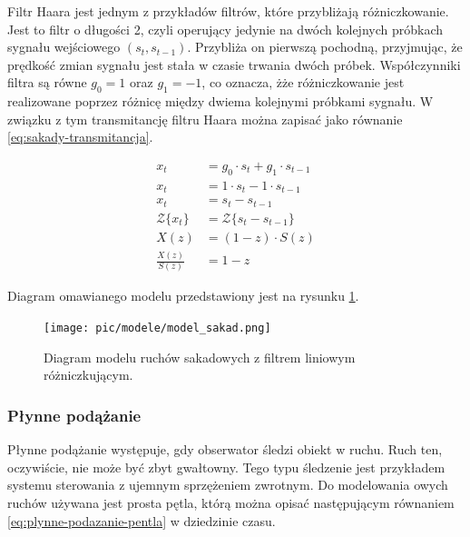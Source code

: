 \documentclass[a4paper,twoside,12pt]{book}
\begin{document}
Filtr Haara jest jednym z przykładów filtrów, które przybliżają różniczkowanie. Jest to filtr o długości 2, czyli operujący jedynie na dwóch kolejnych próbkach sygnału wejściowego $(s_t, s_{t-1})$. Przybliża on pierwszą pochodną, przyjmując, że prędkość zmian sygnału jest stała w czasie trwania dwóch próbek. Współczynniki filtra są równe $g_0 = 1$ oraz $g_1 = -1$, co oznacza, żże różniczkowanie jest realizowane poprzez różnicę między dwiema kolejnymi próbkami sygnału. W związku z tym transmitancję filtru Haara można zapisać jako równanie \ref{eq:sakady-transmitancja}.

\begin{align} %
	x_t &= g_0 \cdot s_t + g_1 \cdot s_{t-1} \nonumber \\
	x_t &= 1 \cdot s_t - 1 \cdot s_{t-1} \nonumber \\
	x_t &= s_t - s_{t-1} \nonumber \\
	\mathcal{Z}\{x_t\} &= \mathcal{Z} \{s_t - s_{t-1}\} \nonumber \\
	X(z) &= (1 - z) \cdot S(z) \nonumber \\ %
	\frac{X(z)}{S(z)} &= 1 - z \label{eq:sakady-transmitancja}
\end{align}   %

Diagram omawianego modelu przedstawiony jest na rysunku \ref{fig:model-sakad}.

\begin{figure}[htbp]
	\centering
	\texttt{[image: pic/modele/model\_sakad.png]}
	\caption{Diagram modelu ruchów sakadowych z filtrem liniowym różniczkującym.}
	\label{fig:model-sakad}
\end{figure}

\subsubsection{Płynne podążanie}
\label{subsubsec:plynne-podazanie}

Płynne podążanie występuje, gdy obserwator śledzi obiekt w ruchu. Ruch ten, oczywiście, nie może być zbyt gwałtowny. Tego typu śledzenie jest przykładem systemu sterowania z ujemnym sprzężeniem zwrotnym. Do modelowania owych ruchów używana jest prosta pętla, którą można opisać następującym równaniem \ref{eq:plynne-podazanie-pentla} w dziedzinie czasu.
\end{document}
